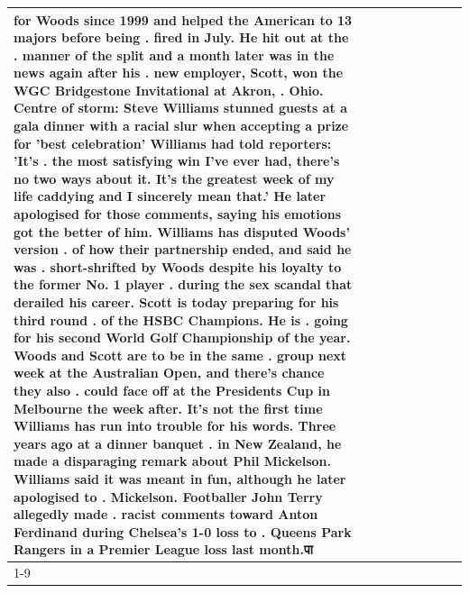 \begin{table}[H]
\begin{tabular}{lllrlllll}
for Woods since 1999 and helped the American to 13 majors before being . fired in July. He hit out at the . manner of the split and a month later was in the news again after his . new employer, Scott, won the WGC Bridgestone Invitational at Akron, . Ohio. Centre of storm: Steve Williams stunned guests at a gala dinner with a racial slur when accepting a prize for 'best celebration' Williams had told reporters: 'It's . the most satisfying win I've ever had, there's no two ways about it. It's the greatest week of my life caddying and I sincerely mean that.' He later apologised for those comments, saying his emotions got the better of him. Williams has disputed Woods' version . of how their partnership ended, and said he was . short-shrifted by Woods despite his loyalty to the former No. 1 player . during the sex scandal that derailed his career. Scott is today preparing for his third round . of the HSBC Champions. He is . going for his second World Golf Championship of the year. Woods and Scott are to be in the same . group next week at the Australian Open, and there's chance they also . could face off at the Presidents Cup in Melbourne the week after. It's not the first time Williams has run into trouble for his words. Three years ago at a dinner banquet . in New Zealand, he made a disparaging remark about Phil Mickelson. Williams said it was meant in fun, although he later apologised to . Mickelson. Footballer John Terry allegedly made . racist comments toward Anton Ferdinand during Chelsea's 1-0 loss to . Queens Park Rangers in a Premier League loss last month.पा \\
\cline{1-9}

\end{tabular}
\end{table}
